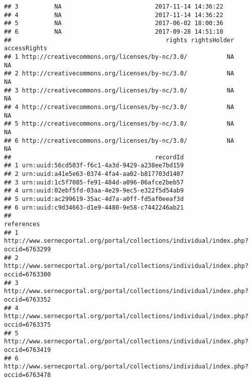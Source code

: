 \documentclass[
]{article}
\begin{document}
\begin{verbatim}
## 3          NA                          2017-11-14 14:36:22
## 4          NA                          2017-11-14 14:36:22
## 5          NA                          2017-06-02 18:00:36
## 6          NA                          2017-09-28 14:51:10
##                                           rights rightsHolder accessRights
## 1 http://creativecommons.org/licenses/by-nc/3.0/           NA           NA
## 2 http://creativecommons.org/licenses/by-nc/3.0/           NA           NA
## 3 http://creativecommons.org/licenses/by-nc/3.0/           NA           NA
## 4 http://creativecommons.org/licenses/by-nc/3.0/           NA           NA
## 5 http://creativecommons.org/licenses/by-nc/3.0/           NA           NA
## 6 http://creativecommons.org/licenses/by-nc/3.0/           NA           NA
##                                        recordId
## 1 urn:uuid:56cd503f-f6c1-4a3d-9429-a238ee7bd159
## 2 urn:uuid:a41e5e63-0374-4fa4-aa02-b817703d1407
## 3 urn:uuid:1c5f7085-fe91-484d-a096-06afce2beb57
## 4 urn:uuid:02ebf5fd-03aa-4e29-9ec5-e322f5d54ab9
## 5 urn:uuid:ac299619-35ac-4d7a-a0ff-fd5af0eeaf3d
## 6 urn:uuid:c9d34663-d1e9-4480-9e58-c7442246ab21
##                                                                          references
## 1 http://www.sernecportal.org/portal/collections/individual/index.php?occid=6763299
## 2 http://www.sernecportal.org/portal/collections/individual/index.php?occid=6763300
## 3 http://www.sernecportal.org/portal/collections/individual/index.php?occid=6763352
## 4 http://www.sernecportal.org/portal/collections/individual/index.php?occid=6763375
## 5 http://www.sernecportal.org/portal/collections/individual/index.php?occid=6763419
## 6 http://www.sernecportal.org/portal/collections/individual/index.php?occid=6763478
\end{verbatim}
\end{document}

